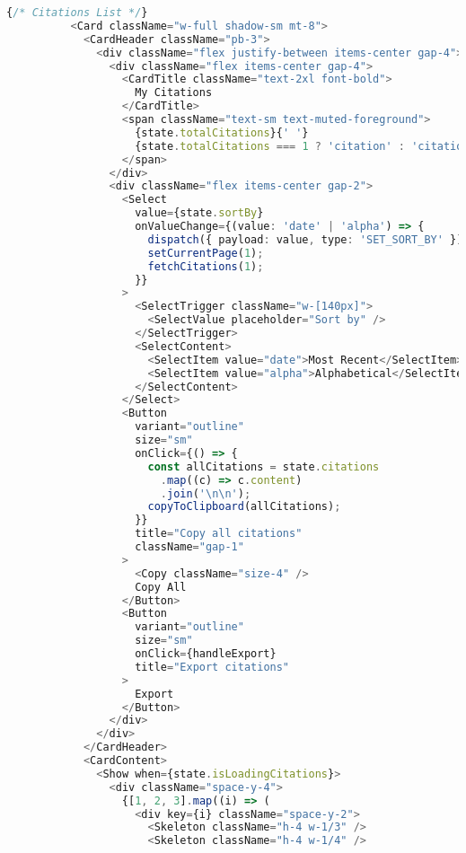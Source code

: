 \begin{lstlisting}[language=TypeScript, caption={Pembuatan Sitasi}, inputencoding=utf8]
          {/* Citations List */}
          <Card className="w-full shadow-sm mt-8">
            <CardHeader className="pb-3">
              <div className="flex justify-between items-center gap-4">
                <div className="flex items-center gap-4">
                  <CardTitle className="text-2xl font-bold">
                    My Citations
                  </CardTitle>
                  <span className="text-sm text-muted-foreground">
                    {state.totalCitations}{' '}
                    {state.totalCitations === 1 ? 'citation' : 'citations'}
                  </span>
                </div>
                <div className="flex items-center gap-2">
                  <Select
                    value={state.sortBy}
                    onValueChange={(value: 'date' | 'alpha') => {
                      dispatch({ payload: value, type: 'SET_SORT_BY' });
                      setCurrentPage(1);
                      fetchCitations(1);
                    }}
                  >
                    <SelectTrigger className="w-[140px]">
                      <SelectValue placeholder="Sort by" />
                    </SelectTrigger>
                    <SelectContent>
                      <SelectItem value="date">Most Recent</SelectItem>
                      <SelectItem value="alpha">Alphabetical</SelectItem>
                    </SelectContent>
                  </Select>
                  <Button
                    variant="outline"
                    size="sm"
                    onClick={() => {
                      const allCitations = state.citations
                        .map((c) => c.content)
                        .join('\n\n');
                      copyToClipboard(allCitations);
                    }}
                    title="Copy all citations"
                    className="gap-1"
                  >
                    <Copy className="size-4" />
                    Copy All
                  </Button>
                  <Button
                    variant="outline"
                    size="sm"
                    onClick={handleExport}
                    title="Export citations"
                  >
                    Export
                  </Button>
                </div>
              </div>
            </CardHeader>
            <CardContent>
              <Show when={state.isLoadingCitations}>
                <div className="space-y-4">
                  {[1, 2, 3].map((i) => (
                    <div key={i} className="space-y-2">
                      <Skeleton className="h-4 w-1/3" />
                      <Skeleton className="h-4 w-1/4" />

\end{lstlisting}
